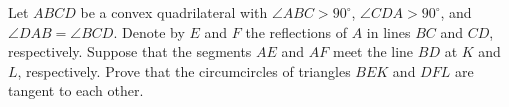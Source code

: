 Let $ABCD$ be a convex quadrilateral with $\angle ABC > 90^\circ$, $\angle CDA > 90^\circ$, and $\angle DAB = \angle BCD$. Denote by $E$ and $F$ the reflections of $A$ in lines $BC$ and $CD$, respectively. Suppose that the segments $AE$ and $AF$ meet the line $BD$ at $K$ and $L$, respectively. Prove that the circumcircles of triangles $BEK$ and $DFL$ are tangent to each other.

